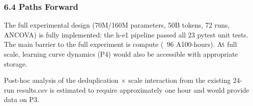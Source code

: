 \subsubsection{6.4 Paths Forward}

The full experimental design (70M/160M parameters, 50B tokens, 72 runs, ANCOVA) is fully implemented: the h-e1 pipeline passed all 23 pytest unit tests. The main barrier to the full experiment is compute (~96 A100-hours). At full scale, learning curve dynamics (P4) would also be accessible with appropriate storage.

Post-hoc analysis of the deduplication $\times$ scale interaction from the existing 24-run results.csv is estimated to require approximately one hour and would provide data on P3.
